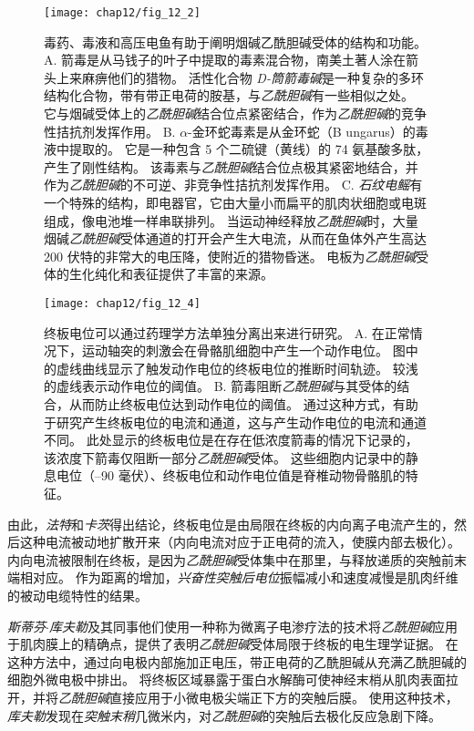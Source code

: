 \begin{figure}[htbp]
	\centering
	\texttt{[image: chap12/fig\_12\_2]}
	\caption{毒药、毒液和高压电鱼有助于阐明烟碱乙酰胆碱受体的结构和功能。 
	A. 箭毒是从马钱子的叶子中提取的毒素混合物，南美土著人涂在箭头上来麻痹他们的猎物。
	活性化合物 \textit{D-筒箭毒碱}是一种复杂的多环结构化合物，带有带正电荷的胺基，与\textit{乙酰胆碱}有一些相似之处。
	它与烟碱受体上的\textit{乙酰胆碱}结合位点紧密结合，作为\textit{乙酰胆碱}的竞争性拮抗剂发挥作用。
	B. $\alpha$-金环蛇毒素是从金环蛇（B ungarus）的毒液中提取的。
	它是一种包含 5 个二硫键（黄线）的 74 氨基酸多肽，产生了刚性结构。
	该毒素与\textit{乙酰胆碱}结合位点极其紧密地结合，并作为\textit{乙酰胆碱}的不可逆、非竞争性拮抗剂发挥作用。
	C. \textit{石纹电鳐}有一个特殊的结构，即电器官，它由大量小而扁平的肌肉状细胞或电斑组成，像电池堆一样串联排列。
	当运动神经释放\textit{乙酰胆碱}时，大量烟碱\textit{乙酰胆碱}受体通道的打开会产生大电流，从而在鱼体外产生高达 200 伏特的非常大的电压降，使附近的猎物昏迷。
	电板为\textit{乙酰胆碱}受体的生化纯化和表征提供了丰富的来源。}
	\label{fig:12_2}
\end{figure}


\begin{figure}[htbp]
	\centering
	\texttt{[image: chap12/fig\_12\_4]}
	\caption{终板电位可以通过药理学方法单独分离出来进行研究。
		A. 在正常情况下，运动轴突的刺激会在骨骼肌细胞中产生一个动作电位。
		图中的虚线曲线显示了触发动作电位的终板电位的推断时间轨迹。
		较浅的虚线表示动作电位的阈值。
		B. 箭毒阻断\textit{乙酰胆碱}与其受体的结合，从而防止终板电位达到动作电位的阈值。
		通过这种方式，有助于研究产生终板电位的电流和通道，这与产生动作电位的电流和通道不同。
		此处显示的终板电位是在存在低浓度箭毒的情况下记录的，该浓度下箭毒仅阻断一部分\textit{乙酰胆碱}受体。
		这些细胞内记录中的静息电位（–90 毫伏）、终板电位和动作电位值是脊椎动物骨骼肌的特征。}
	\label{fig:12_4}
\end{figure}


由此，\textit{法特}和\textit{卡茨}得出结论，终板电位是由局限在终板的内向离子电流产生的，然后这种电流被动地扩散开来（内向电流对应于正电荷的流入，使膜内部去极化）。
内向电流被限制在终板，是因为\textit{乙酰胆碱}受体集中在那里，与释放递质的突触前末端相对应。
作为距离的增加，\textit{兴奋性突触后电位}振幅减小和速度减慢是肌肉纤维的被动电缆特性的结果。


\textit{斯蒂芬$\cdot$库夫勒}及其同事他们使用一种称为微离子电渗疗法的技术将\textit{乙酰胆碱}应用于肌肉膜上的精确点，提供了表明\textit{乙酰胆碱}受体局限于终板的电生理学证据。
在这种方法中，通过向电极内部施加正电压，带正电荷的乙酰胆碱从充满乙酰胆碱的细胞外微电极中排出。
将终板区域暴露于蛋白水解酶可使神经末梢从肌肉表面拉开，并将\textit{乙酰胆碱}直接应用于小微电极尖端正下方的突触后膜。
使用这种技术，\textit{库夫勒}发现在\textit{突触末稍}几微米内，对\textit{乙酰胆碱}的突触后去极化反应急剧下降。


